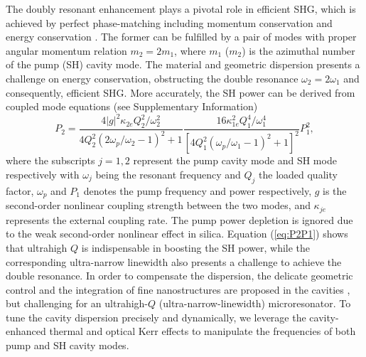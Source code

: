 \documentclass[a4paper,8pt,hyperref, twocolumn, aps, prl]{article}
\begin{document}
The doubly resonant enhancement plays a pivotal role in efficient SHG, which is achieved by perfect phase-matching including momentum conservation and energy conservation \cite{boyd2003nonlinear}.
The former can be fulfilled by a pair of modes with proper angular momentum relation $m_2=2m_1$, where $m_1$ ($m_2$) is the azimuthal number of the pump (SH) cavity mode.
The material and geometric dispersion presents a challenge on energy conservation, obstructing the double resonance $\omega_2=2\omega_1$ and consequently, efficient SHG.
More accurately, the SH power can be derived from coupled mode equations (see Supplementary Information)
\begin{equation}
P_2 = \frac{4|g|^2\kappa_{2e}Q_2^2/\omega_2^2}{4Q_2^2(2\omega_p/\omega_2-1)^2+1}\frac{16\kappa_{1e}^2Q_1^4/\omega_1^4}{[4Q_1^2(\omega_p/\omega_1-1)^2+1]^2}P_1^2,
\label{eq:P2P1}
\end{equation}
where the subscripts $j=1, 2$ represent the pump cavity mode and SH mode respectively with $\omega_j$ being the resonant frequency and $Q_j$ the loaded quality factor, $\omega_p$ and $P_1$ denotes the pump frequency and power respectively, $g$ is the second-order nonlinear coupling strength between the two modes, and $\kappa_{je}$ represents the external coupling rate. The pump power depletion is ignored due to the weak second-order nonlinear effect in silica.
Equation (\ref{eq:P2P1}) shows that ultrahigh $Q$ is indispensable in boosting the SH power, while the corresponding ultra-narrow linewidth also presents a challenge to achieve the double resonance.  %
In order to compensate the dispersion, the delicate geometric control and the integration of fine nanostructures are proposed in the cavities \cite{levy2011harmonic, kozyreff2008whispering, xu2008second, dominguez2011whispering}, but challenging for an ultrahigh-$Q$ (ultra-narrow-linewidth) microresonator.
To tune the cavity dispersion precisely and dynamically, we leverage the cavity-enhanced thermal and optical Kerr effects to manipulate the frequencies of both pump and SH cavity modes.
\end{document}
